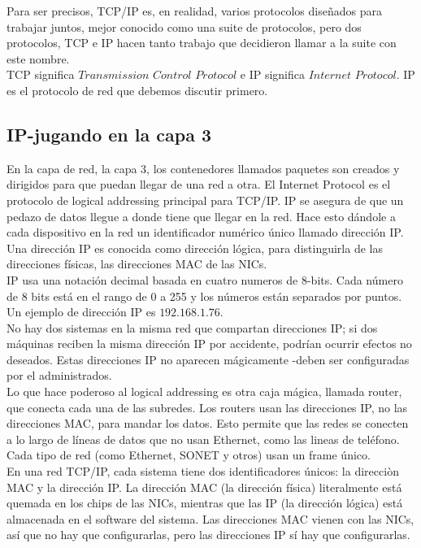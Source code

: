 \documentclass[12pt]{report}
\begin{document}
Para ser precisos, TCP/IP es, en realidad, varios protocolos diseñados para trabajar juntos,
mejor conocido como una suite de protocolos, pero dos protocolos, TCP  e IP hacen tanto
trabajo que decidieron llamar a la suite con este nombre.\\
TCP significa $\textit{Transmission Control Protocol}$ e 
IP significa $\textit{Internet Protocol}$. IP es el protocolo de red
que debemos discutir primero.

\subsection{IP-jugando en la capa 3}
En la capa de red, la capa 3, los contenedores llamados paquetes son creados 
y dirigidos para que puedan llegar de una red a otra. El Internet Protocol
es el protocolo de logical addressing principal para TCP/IP.
IP se asegura de que un pedazo de datos llegue a donde tiene que llegar en la red.
Hace esto dándole a cada dispositivo en la red un identificador numérico 
único llamado dirección IP. Una dirección IP es conocida como dirección lógica, 
para distinguirla de las direcciones físicas, las direcciones MAC de las NICs.\\
IP usa una notación decimal basada en cuatro numeros de 8-bits.
Cada número de 8 bits está en el rango de 0 a 255 y los números están separados por puntos.
Un ejemplo de dirección IP es $\textit{192.168.1.76}$.\\
No hay dos sistemas en la misma red que compartan direcciones IP;
si dos máquinas reciben la misma dirección IP por accidente, podrían ocurrir
efectos no deseados. Estas direcciones IP no aparecen mágicamente -deben ser configuradas
por el administrados.\\
Lo que hace poderoso al logical addressing es otra caja mágica, llamada router, que conecta
cada una de las subredes. Los routers usan las direcciones IP, no las direcciones MAC, para
mandar los datos. Esto permite que las redes se conecten a lo largo de líneas de datos que no
usan Ethernet, como las lineas de teléfono. Cada tipo de red (como Ethernet, SONET y otros)
usan un frame único.\\
En una red TCP/IP, cada sistema tiene dos identificadores únicos: la direcciòn MAC y 
la dirección IP. La dirección MAC (la dirección física) literalmente
está quemada en los chips de las NICs, mientras que las IP (la dirección lógica)
está almacenada en el software del sistema. Las direcciones MAC vienen con las NICs, así que 
no hay que configurarlas, pero las direcciones IP sí hay que configurarlas.
\end{document}
